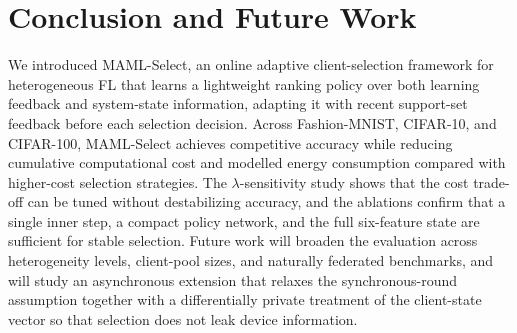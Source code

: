 \documentclass[journal]{IEEEtran}
\newcommand{\revision}[1]{#1}
\begin{document}
\section{Conclusion and Future Work}
\revision{We introduced MAML-Select, an online adaptive client-selection framework for heterogeneous FL that learns a lightweight ranking policy over both learning feedback and system-state information, adapting it with recent support-set feedback before each selection decision.
Across Fashion-MNIST, CIFAR-10, and CIFAR-100, MAML-Select achieves competitive accuracy while reducing cumulative computational cost and modelled energy consumption compared with higher-cost selection strategies. The $\lambda$-sensitivity study shows that the cost trade-off can be tuned without destabilizing accuracy, and the ablations confirm that a single inner step, a compact policy network, and the full six-feature state are sufficient for stable selection. Future work will broaden the evaluation across heterogeneity levels, client-pool sizes, and naturally federated benchmarks, and will study an asynchronous extension that relaxes the synchronous-round assumption together with a differentially private treatment of the client-state vector so that selection does not leak device information.}
\end{document}
